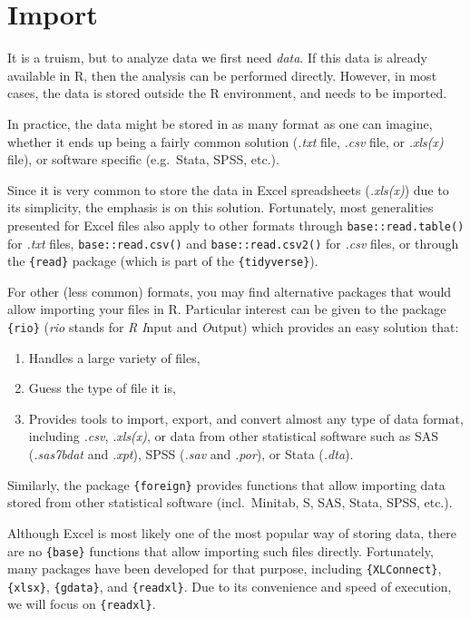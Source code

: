 \documentclass[
]{krantz}
\providecommand{\tightlist}{%
  \setlength{\itemsep}{0pt}\setlength{\parskip}{0pt}}
\begin{document}
\hypertarget{data-import}{%
\section{Import}\label{data-import}}

It is a truism, but to analyze data we first need \emph{data}. If this data is already available in R, then the analysis can be performed directly. However, in most cases, the data is stored outside the R environment, and needs to be imported.

In practice, the data might be stored in as many format as one can imagine, whether it ends up being a fairly common solution (\emph{.txt} file, \emph{.csv} file, or \emph{.xls(x)} file), or software specific (e.g.~Stata, SPSS, etc.).

Since it is very common to store the data in Excel spreadsheets (\emph{.xls(x)}) due to its simplicity, the emphasis is on this solution. Fortunately, most generalities presented for Excel files also apply to other formats through \texttt{base::read.table()} for \emph{.txt} files, \texttt{base::read.csv()} and \texttt{base::read.csv2()} for \emph{.csv} files, or through the \texttt{\{read\}} package (which is part of the \texttt{\{tidyverse\}}).

For other (less common) formats, you may find alternative packages that would allow importing your files in R. Particular interest can be given to the package \texttt{\{rio\}} (\emph{rio} stands for \emph{R} \emph{I}nput and \emph{O}utput) which provides an easy solution that:

\begin{enumerate}
\def\labelenumi{\arabic{enumi}.}
\tightlist
\item
  Handles a large variety of files,
\item
  Guess the type of file it is,
\item
  Provides tools to import, export, and convert almost any type of data format, including \emph{.csv}, \emph{.xls(x)}, or data from other statistical software such as SAS (\emph{.sas7bdat} and \emph{.xpt}), SPSS (\emph{.sav} and \emph{.por}), or Stata (\emph{.dta}).
\end{enumerate}

Similarly, the package \texttt{\{foreign\}} provides functions that allow importing data stored from other statistical software (incl.~Minitab, S, SAS, Stata, SPSS, etc.).

Although Excel is most likely one of the most popular way of storing data, there are no \texttt{\{base\}} functions that allow importing such files directly. Fortunately, many packages have been developed for that purpose, including \texttt{\{XLConnect\}}, \texttt{\{xlsx\}}, \texttt{\{gdata\}}, and \texttt{\{readxl\}}. Due to its convenience and speed of execution, we will focus on \texttt{\{readxl\}}.
\end{document}

